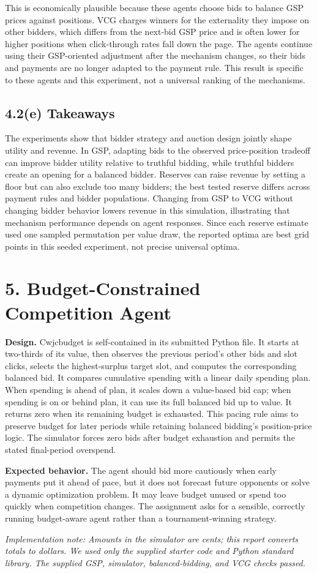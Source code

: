 \documentclass[10pt]{article}
\begin{document}
This is economically plausible because these agents choose bids to balance GSP prices against positions. VCG charges winners for the externality they impose on other bidders, which differs from the next-bid GSP price and is often lower for higher positions when click-through rates fall down the page. The agents continue using their GSP-oriented adjustment after the mechanism changes, so their bids and payments are no longer adapted to the payment rule. This result is specific to these agents and this experiment, not a universal ranking of the mechanisms.

\subsection*{4.2(e) Takeaways}
The experiments show that bidder strategy and auction design jointly shape utility and revenue. In GSP, adapting bids to the observed price-position tradeoff can improve bidder utility relative to truthful bidding, while truthful bidders create an opening for a balanced bidder. Reserves can raise revenue by setting a floor but can also exclude too many bidders; the best tested reserve differs across payment rules and bidder populations. Changing from GSP to VCG without changing bidder behavior lowers revenue in this simulation, illustrating that mechanism performance depends on agent responses. Since each reserve estimate used one sampled permutation per value draw, the reported optima are best grid points in this seeded experiment, not precise universal optima.

\section*{5. Budget-Constrained Competition Agent}
\textbf{Design.} Cwjcbudget is self-contained in its submitted Python file. It starts at two-thirds of its value, then observes the previous period's other bids and slot clicks, selects the highest-surplus target slot, and computes the corresponding balanced bid. It compares cumulative spending with a linear daily spending plan. When spending is ahead of plan, it scales down a value-based bid cap; when spending is on or behind plan, it can use its full balanced bid up to value. It returns zero when its remaining budget is exhausted. This pacing rule aims to preserve budget for later periods while retaining balanced bidding's position-price logic. The simulator forces zero bids after budget exhaustion and permits the stated final-period overspend.

\textbf{Expected behavior.} The agent should bid more cautiously when early payments put it ahead of pace, but it does not forecast future opponents or solve a dynamic optimization problem. It may leave budget unused or spend too quickly when competition changes. The assignment asks for a sensible, correctly running budget-aware agent rather than a tournament-winning strategy.

\vspace{4pt}
\textit{Implementation note: Amounts in the simulator are cents; this report converts totals to dollars. We used only the supplied starter code and Python standard library. The supplied GSP, simulator, balanced-bidding, and VCG checks passed.}
\end{document}

